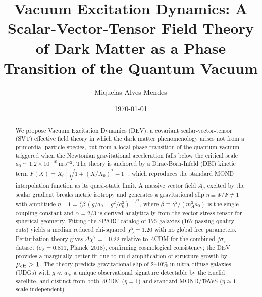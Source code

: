 \documentclass[aps,prd,twocolumn,showpacs,superscriptaddress]{revtex4-2}
\newcommand{\aO}{a_0}
\newcommand{\LCDM}{$\Lambda$CDM}
\begin{document}
\title{Vacuum Excitation Dynamics: A Scalar-Vector-Tensor Field Theory
       of Dark Matter as a Phase Transition of the Quantum Vacuum}

\author{Miqueias Alves Mendes}

\date{\today}

\begin{abstract}
We propose Vacuum Excitation Dynamics (DEV), a covariant
scalar-vector-tensor (SVT) effective field theory in which the dark
matter phenomenology arises not from a primordial particle species,
but from a local phase transition of the quantum vacuum triggered when
the Newtonian gravitational acceleration falls below the critical scale
$\aO \simeq 1.2\times10^{-10}$\,m\,s$^{-2}$.
The theory is anchored by a Dirac-Born-Infeld (DBI) kinetic term
$F(X) = X_0[\sqrt{1+(X/X_0)^2}-1]$,
which reproduces the standard MOND interpolation function as its
quasi-static limit.
A massive vector field $A_\mu$ excited by the scalar gradient breaks
metric isotropy and generates a gravitational slip
$\eta \equiv \Phi/\Psi \neq 1$ with amplitude
$\eta - 1 = \frac{2}{3}\beta\,(g/\aO+g^2/\aO^2)^{-1/2}$,
where $\beta \equiv \gamma^2/(m_A^2 \aO)$ is the single coupling constant
and $\alpha = 2/3$ is derived analytically from the vector stress tensor
for spherical geometry.
Fitting the SPARC catalog of 175 galaxies (167 passing quality cuts)
yields a median reduced chi-squared $\chi^2_\nu = 1.20$
with no global free parameters.
Perturbation theory gives $\Delta\chi^2 = -0.22$ relative to \LCDM{}
for the combined $f\sigma_8$ dataset ($\sigma_8 = 0.811$, Planck~2018),
confirming cosmological consistency; the DEV provides a marginally
better fit due to mild amplification of structure growth by
$\mu_{\rm eff} > 1$.
The theory predicts gravitational slip of $2$--$10\%$ in
ultra-diffuse galaxies (UDGs) with $g \ll \aO$, a unique
observational signature detectable by the Euclid satellite,
and distinct from both \LCDM{} ($\eta=1$) and
standard MOND/TeVeS ($\eta\approx 1$, scale-independent).
\end{abstract}


\maketitle
\end{document}
